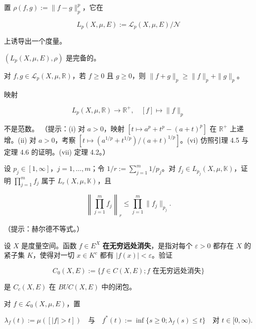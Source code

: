 \begin{exercises}
\begin{subitems}
置 $ \rho(f,g) := \|f-g\|_p^p $，它在

\[
L_p(X,\mu,E) := \mathcal{L}_p(X,\mu,E)/\mathcal{N}
\]

上诱导出一个度量。

\item

$ (L_p(X,\mu,E),\rho) $ 是完备的。

\item

对 $ f,g \in \mathcal{L}_p(X,\mu,\mathbb{R}) $，若 $ f \ge 0 $ 且 $ g \ge 0 $，则 $ \|f+g\|_p \ge \|f\|_p + \|g\|_p $。

\item

映射

\[
L_p(X,\mu,\mathbb{R}) \to \mathbb{R}^+ , \quad [f] \mapsto \|f\|_p
\]

不是范数。
（提示：(i) 对 $ a > 0 $，映射 $ [t \mapsto a^p + t^p - (a+t)^p] $ 在 $ \mathbb{R}^+ $ 上递增。(ii) 对 $ a > 0 $，考察 $ [t \mapsto (a^{1/p} + t^{1/p})/(a+t)^{1/p}] $。(vi) 仿照引理 4.5 与定理 4.6 的证明。(vii) 定理 4.2。）

\end{subitems}

\item

设 $ p_j \in [1,\infty] $，$ j = 1,\dots,m $；令 $ 1/r := \sum_{j=1}^{m} 1/p_j $。对 $ f_j \in L_{p_j}(X,\mu,\mathbb{K}) $，证明 $ \prod_{j=1}^{m} f_j $ 属于 $ L_r(X,\mu,\mathbb{K}) $，且

\[
\left\| \prod_{j=1}^{m} f_j \right\|_r \le \prod_{j=1}^{m} \|f_j\|_{p_j} .
\]

（提示：赫尔德不等式。）

\item

设 $ X $ 是度量空间。函数 $ f \in E^X $ \textbf{在无穷远处消失}，是指对每个 $ \varepsilon > 0 $ 都存在 $ X $ 的紧子集 $ K $，使得对一切 $ x \in K^c $ 都有 $ |f(x)| < \varepsilon $。验证

\[
C_0(X,E) := \{ f \in C(X,E) ; f \text{ 在无穷远处消失} \}
\]

是 $ C_c(X,E) $ 在 $ BUC(X,E) $ 中的闭包。

\item

对 $ f \in \mathcal{L}_0(X,\mu,E) $，置

\[
\lambda_f(t) := \mu([|f| > t]) \quad \text{与} \quad f^*(t) := \inf\{ s \ge 0 ; \lambda_f(s) \le t \} \quad \text{对 } t \in [0,\infty) .
\]


\end{exercises}
